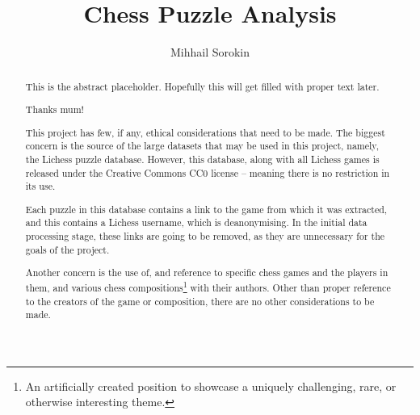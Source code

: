 \documentclass[a4paper, twoside]{report}
\title{Chess Puzzle Analysis}
\author{Mihhail Sorokin}
\begin{document}



\begin{abstract}

    This is the abstract placeholder. Hopefully this will get filled with
    proper text later.

\end{abstract}

\renewcommand{\abstractname}{Acknowledgements}
\begin{abstract}

    Thanks mum!

\end{abstract}

\renewcommand{\abstractname}{Ethical Discussion}
\begin{abstract}

    This project has few, if any, ethical considerations that need to be made.
    The biggest concern is the source of the large datasets that may be used in
    this project, namely, the Lichess puzzle database. However, this database,
    along with all Lichess games is released under the Creative Commons CC0
    license -- meaning there is no restriction in its use.

    Each puzzle in this database contains a link to the game from which it was
    extracted, and this contains a Lichess username, which is deanonymising. In
    the initial data processing stage, these links are going to be removed, as
    they are unnecessary for the goals of the project.

    Another concern is the use of, and reference to specific chess games and
    the players in them, and various chess compositions\footnote{An
    artificially created position to showcase a uniquely challenging, rare, or
    otherwise interesting theme.} with their authors. Other than proper
    reference to the creators of the game or composition, there are no other
    considerations to be made.

\end{abstract}

\tableofcontents






%



\end{document}
